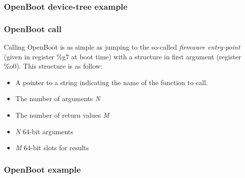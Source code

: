 
\begin{frame}
  \frametitle{OpenBoot device-tree example}

  \begin{center}
  \end{center}

\end{frame}


\begin{frame}
  \frametitle{OpenBoot call}

  Calling OpenBoot is as simple as jumping to the so-called
  \emph{firmware entry-point} (given in register \%g7 at boot time)
  with a structure in first argument (register \%o0). This structure is
  as follow:

  \begin{itemize}
  \item
    A pointer to a string indicating the name of the function to call.
  \item
    The number of arguments \emph{N}
  \item
    The number of return values \emph{M}
  \item
    \emph{N} 64-bit arguments
  \item
    \emph{M} 64-bit slots for results
  \end{itemize}

\end{frame}


\begin{frame}
  \frametitle{OpenBoot example}

  \begin{center}
  \end{center}

\end{frame}

%
%

